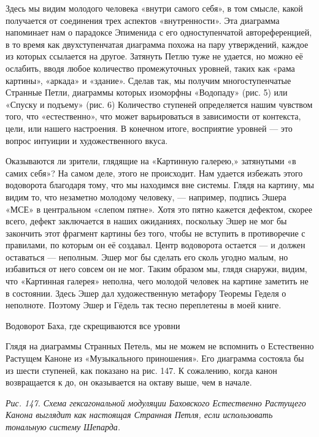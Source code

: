 \documentclass[../main.tex]{subfiles}
\begin{document}
Здесь мы видим молодого человека «внутри самого себя», в том смысле, какой получается от соединения трех аспектов «внутренности». Эта диаграмма напоминает нам о парадоксе Эпименида с его одноступенчатой автореференцией, в то время как двухступенчатая диаграмма похожа на пару утверждений, каждое из которых ссылается на другое. Затянуть Петлю туже не удается, но можно её ослабить, вводя любое количество промежуточных уровней, таких как «рама картины», «аркада» и «здание». Сделав так, мы получим многоступенчатые Странные Петли, диаграммы которых изоморфны «Водопаду» (рис. 5) или «Спуску и подъему» (рис. 6) Количество ступеней определяется нашим чувством того, что «естественно», что может варьироваться в зависимости от контекста, цели, или нашего настроения. В конечном итоге, восприятие уровней --- это вопрос интуиции и художественного вкуса.

Оказываются ли зрители, глядящие на «Картинную галерею,» затянутыми «в самих себя»? На самом деле, этого не происходит. Нам удается избежать этого водоворота благодаря тому, что мы находимся вне системы. Глядя на картину, мы видим то, что незаметно молодому человеку, --- например, подпись Эшера «МСЕ» в центральном «слепом пятне». Хотя это пятно кажется дефектом, скорее всего, дефект заключается в наших ожиданиях, поскольку Эшер не мог бы закончить этот фрагмент картины без того, чтобы не вступить в противоречие с правилами, по которым он её создавал. Центр водоворота остается --- и должен оставаться --- неполным. Эшер мог бы сделать его сколь угодно малым, но избавиться от него совсем он не мог. Таким образом мы, глядя снаружи, видим, что «Картинная галерея» неполна, чего молодой человек на картине заметить не в состоянии. Здесь Эшер дал художественную метафору Теоремы Геделя о неполноте. Поэтому Эшер и Гёдель так тесно переплетены в моей книге.

Водоворот Баха, где скрещиваются все уровни

Глядя на диаграммы Странных Петель, мы не можем не вспомнить о Естественно Растущем Каноне из «Музыкального приношения». Его диаграмма состояла бы из шести ступеней, как показано на рис. 147. К сожалению, когда канон возвращается к до, он оказывается на октаву выше, чем в начале.

\emph{Рис. 147. Схема гексагональной модуляции Баховского Естественно Растущего Канона выглядит как настоящая Странная Петля, если использовать тональную систему Шепарда.}
\end{document}
